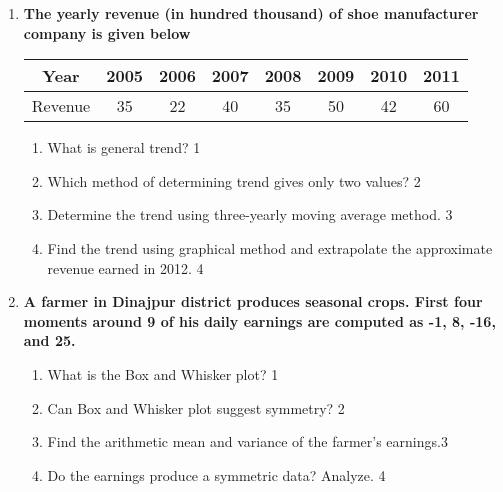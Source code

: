 \documentclass{article}
\begin{document}
\begin{enumerate}
   \item
	  \textbf{The yearly revenue (in hundred thousand) of shoe manufacturer company is given below} 
  \begin{table}[h]
\centering
\begin{tabular}{cccccccc}
Year     & 2005 & 2006 & 2007 & 2008 & 2009 & 2010 & 2011 \\ \hline
Revenue & 35   & 22    & 40     & 35     & 50     & 42 & 60   
\end{tabular}
\end{table}
  
  \begin{enumerate}
    \item
	What is general trend? \hfill 1
    \item
	Which method of determining trend gives only two values? \hfill 2
    \item  
	Determine the trend using three-yearly moving average method. \hfill 3
    \item
	Find the trend using graphical method and extrapolate the approximate revenue earned in 2012. \hfill 4
  \end{enumerate}

 \item
	  \textbf{A farmer in Dinajpur district produces seasonal crops. First four moments around 9 of his daily earnings are computed as -1, 8, -16, and 25.}
  
  \begin{enumerate}
    \item
	What is the Box and Whisker plot? \hfill 1
    \item
	Can Box and Whisker plot suggest symmetry? \hfill 2
    \item  
	 Find the arithmetic mean and variance of the farmer's earnings.\hfill 3
    \item
	Do the earnings produce a symmetric data? Analyze. \hfill 4
  \end{enumerate}

\end{enumerate}
\end{document}
